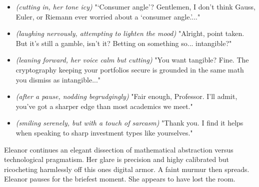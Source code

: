 \begin{itemize}[leftmargin=1.5cm]
\item[Eleanor:] \textit{(cutting in, her tone icy)} "‘Consumer angle’? Gentlemen, I don’t think Gauss, Euler, or Riemann ever worried about a ‘consumer angle.’..."

\item[Investor \#2:] \textit{(laughing nervously, attempting to lighten the mood)} "Alright, point taken. But it’s still a gamble, isn’t it? Betting on something so... intangible?"

\item[Eleanor:] \textit{(leaning forward, her voice calm but cutting)} "You want tangible? Fine. The cryptography keeping your portfolios secure is grounded in the same math you dismiss as intangible..."

\item[Investor \#1:] \textit{(after a pause, nodding begrudgingly)} "Fair enough, Professor. I’ll admit, you’ve got a sharper edge than most academics we meet."

\item[Eleanor:] \textit{(smiling serenely, but with a touch of sarcasm)} "Thank you. I find it helps when speaking to sharp investment types like yourselves."

\end{itemize}

\noindent 
Eleanor continues an elegant dissection of mathematical abstraction versus technological pragmatism. Her glare is precision and highy calibrated but ricocheting harmlessly off this ones digital armor. A faint murmur then spreads. Eleanor pauses for the briefest moment. She appears to have lost the room.

